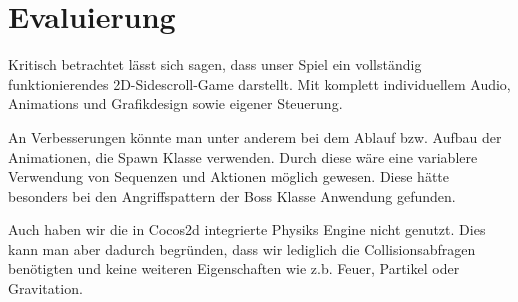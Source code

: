 \chapter{Evaluierung}\label{ch:eval}

Kritisch betrachtet lässt sich sagen, dass unser Spiel ein vollständig funktionierendes 2D-Sidescroll-Game darstellt. Mit komplett individuellem Audio, Animations und Grafikdesign sowie eigener Steuerung. 

An Verbesserungen könnte man unter anderem bei dem Ablauf bzw. Aufbau der Animationen, die Spawn Klasse verwenden. Durch diese wäre eine variablere Verwendung von Sequenzen und Aktionen möglich gewesen. Diese hätte besonders bei den Angriffspattern der Boss Klasse Anwendung gefunden. 

Auch haben wir die in Cocos2d integrierte Physiks Engine nicht genutzt. Dies kann man aber dadurch begründen, dass wir lediglich die Collisionsabfragen benötigten und keine weiteren Eigenschaften wie z.b. Feuer, Partikel oder Gravitation. 

